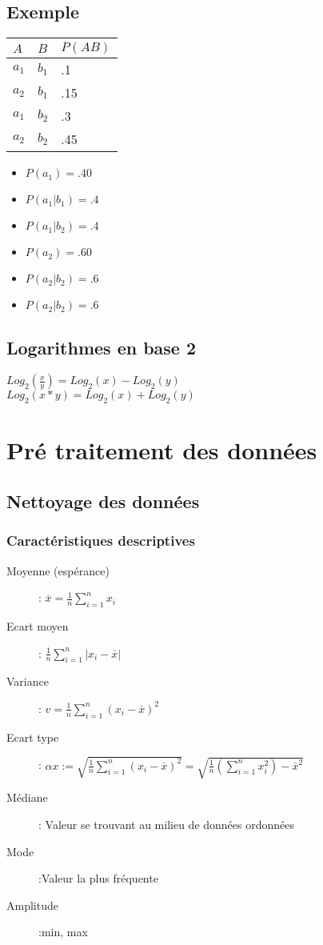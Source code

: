 \section{Exemple}
\begin{multicols}{2}
[]
\begin{tabular}{ll|l}
  \hline
  $A$&$B$&$P(AB)$\\
  \hline
  $a_1$&$b_1$&.1\\
  $a_2$&$b_1$&.15\\
  $a_1$&$b_2$&.3\\
  $a_2$&$b_2$&.45\\
  \hline
\end{tabular}

\begin{itemize}
\item $P(a_1) = .40$
\item $P(a_1|b_1) = .4$
\item $P(a_1|b_2) = .4$
\item $P(a_2) = .60$
\item $P(a_2|b_2) = .6$
\item $P(a_2|b_2) = .6$
\end{itemize}

\end{multicols}

\section{Logarithmes en base 2}
$Log_2(\frac{x}{y}) = Log_2(x) - Log_2(y)$\\
$Log_2(x*y) = Log_2(x) + Log_2(y)$\\

\chapter{Pré traitement des données}
\section{Nettoyage des données}
\subsection{Caractéristiques descriptives}

\begin{description}
\item[Moyenne (espérance)]: $\overset{\_}{x}=\frac{1}{n} \sum_{i=1}^n x_i$
\item[Ecart moyen]: $\frac{1}{n} \sum_{i=1}^n |x_i - \overset{\_}{x} |$
\item[Variance]: $v = \frac{1}{n} \sum_{i=1}^n (x_i - \overset{\_}{x} )^2$
\item[Ecart type]: $\alpha x := \sqrt{\frac{1}{n} \sum_{i=1}^n (x_i - \overset{\_}{x} )^2} = \sqrt{\frac{1}{n}(\sum_{i=1}^n x_i^2) - \overset{\_}{x}^2 }$
\item[Médiane]: Valeur se trouvant au milieu de données ordonnées
\item[Mode]:Valeur la plus fréquente 
\item[Amplitude]:min, max
\end{description}

